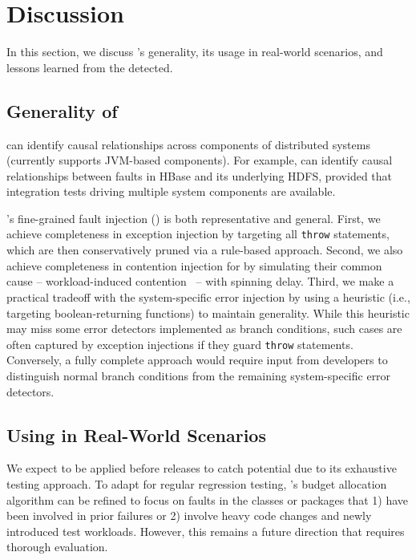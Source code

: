 \section{Discussion}

In this section, we discuss \tool's generality, its usage in real-world scenarios, and lessons learned from the \vcs detected.

\subsection{Generality of \tool}

\tool can identify causal relationships across components of distributed systems 
(currently supports JVM-based components).
For example, \tool can identify causal relationships between faults in HBase and its underlying HDFS, provided that integration tests driving multiple system components are available. 

\tool's fine-grained fault injection () is both representative and general.
First, we achieve completeness in exception injection by targeting all \texttt{throw} statements, which are then conservatively pruned via a rule-based approach. Second, we also achieve completeness in contention injection for \vcs by simulating their common cause -- workload-induced contention~\cite{huang2022metastable, qian2023vicious} -- with spinning delay.
Third, we make a practical tradeoff with the system-specific error injection by using a heuristic (i.e., targeting boolean-returning functions) to maintain generality. While this heuristic may miss some error detectors implemented as branch conditions, such cases are often captured by exception injections if they guard \texttt{throw} statements. Conversely, a fully complete approach would require  input from developers to distinguish normal branch conditions from the remaining system-specific error detectors.

\subsection{Using \tool in Real-World Scenarios}

We expect \tool to be applied 
before releases 
to catch potential \vcs due to its exhaustive testing approach. 
To adapt \tool for regular regression testing, \tool's budget allocation algorithm can be refined to focus on faults in the classes or packages that 1) have been involved in prior failures or 2) involve heavy code changes and newly introduced test workloads. However, this remains a future direction that requires thorough evaluation.

